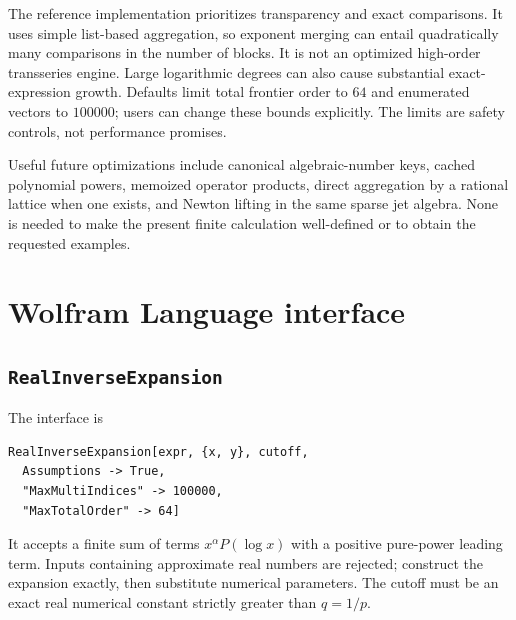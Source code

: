 \documentclass[11pt,a4paper]{article}
\numberwithin{equation}{section}
\theoremstyle{definition}
\begin{document}
The reference implementation prioritizes transparency and exact
comparisons. It uses simple list-based aggregation, so exponent merging
can entail quadratically many comparisons in the number of blocks.
It is not an optimized high-order transseries engine. Large logarithmic
degrees can also cause substantial exact-expression growth. Defaults
limit total frontier order to $64$ and enumerated vectors to $100000$;
users can change these bounds explicitly. The limits are safety controls,
not performance promises.

Useful future optimizations include canonical algebraic-number keys,
cached polynomial powers, memoized operator products, direct aggregation
by a rational lattice when one exists, and Newton lifting in the same
sparse jet algebra. None is needed to make the present finite calculation
well-defined or to obtain the requested examples.

\section{Wolfram Language interface}\label{sec:interface}

\subsection{\texttt{RealInverseExpansion}}
The interface is
\begin{lstlisting}
RealInverseExpansion[expr, {x, y}, cutoff,
  Assumptions -> True,
  "MaxMultiIndices" -> 100000,
  "MaxTotalOrder" -> 64]
\end{lstlisting}
It accepts a finite sum of terms $x^\alpha P(\log x)$ with a positive
pure-power leading term. Inputs containing approximate real numbers are
rejected; construct the expansion exactly, then substitute numerical
parameters. The cutoff must be an exact real numerical constant strictly
greater than $q=1/p$.
\end{document}
